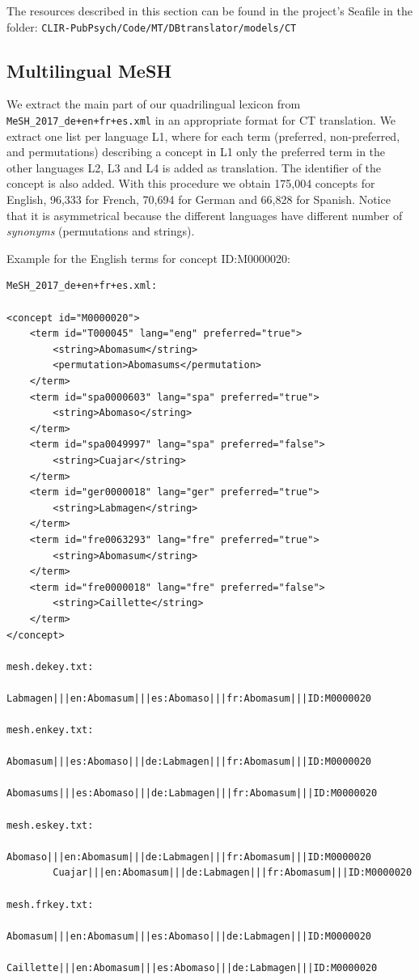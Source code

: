 \documentclass[a4paper,11pt]{article}
\begin{document}
The resources described in this section can be found in the project's Seafile in the folder:
{\tt CLIR-PubPsych/Code/MT/DBtranslator/models/CT} 


\subsection{Multilingual MeSH}
\label{ss:meshLex}

We extract the main part of our quadrilingual lexicon from {\tt MeSH\_2017\_de+en+fr+es.xml} in an appropriate format for CT translation. We extract one list per language L1, where for each term (preferred, non-preferred, and permutations) describing a concept in L1 only the preferred term in the other languages L2, L3 and L4 is added as translation. The identifier of the concept is also added. With this procedure we obtain 175,004 concepts for English, 96,333 for French, 70,694 for German and 66,828 for Spanish. Notice that it is asymmetrical because the different languages have different number of \emph{synonyms} (permutations and strings).

\bigskip
\noindent Example for the English terms for concept ID:M0000020: 

{\small 
\begin{verbatim}
MeSH_2017_de+en+fr+es.xml:
 
<concept id="M0000020">
	<term id="T000045" lang="eng" preferred="true">
		<string>Abomasum</string>
		<permutation>Abomasums</permutation>
	</term>
	<term id="spa0000603" lang="spa" preferred="true">
		<string>Abomaso</string>
	</term>
	<term id="spa0049997" lang="spa" preferred="false">
		<string>Cuajar</string>
	</term>
	<term id="ger0000018" lang="ger" preferred="true">
		<string>Labmagen</string>
	</term>
	<term id="fre0063293" lang="fre" preferred="true">
		<string>Abomasum</string>
	</term>
	<term id="fre0000018" lang="fre" preferred="false">
		<string>Caillette</string>
	</term>
</concept>

mesh.dekey.txt:
        Labmagen|||en:Abomasum|||es:Abomaso|||fr:Abomasum|||ID:M0000020
  
mesh.enkey.txt:
        Abomasum|||es:Abomaso|||de:Labmagen|||fr:Abomasum|||ID:M0000020
        Abomasums|||es:Abomaso|||de:Labmagen|||fr:Abomasum|||ID:M0000020
        
mesh.eskey.txt:       
        Abomaso|||en:Abomasum|||de:Labmagen|||fr:Abomasum|||ID:M0000020
        Cuajar|||en:Abomasum|||de:Labmagen|||fr:Abomasum|||ID:M0000020

mesh.frkey.txt:  
        Abomasum|||en:Abomasum|||es:Abomaso|||de:Labmagen|||ID:M0000020
        Caillette|||en:Abomasum|||es:Abomaso|||de:Labmagen|||ID:M0000020
\end{verbatim}
}
\end{document}
